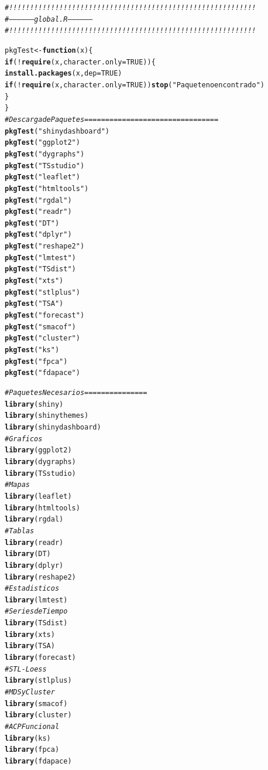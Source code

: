 \documentclass[12pt,oneside]{book}\usepackage[]{graphicx}\usepackage[]{color}
\makeatletter
\newcommand{\hlnum}[1]{\textcolor[rgb]{0.686,0.059,0.569}{#1}}%
\newcommand{\hlstr}[1]{\textcolor[rgb]{0.192,0.494,0.8}{#1}}%
\newcommand{\hlcom}[1]{\textcolor[rgb]{0.678,0.584,0.686}{\textit{#1}}}%
\newcommand{\hlopt}[1]{\textcolor[rgb]{0,0,0}{#1}}%
\newcommand{\hlstd}[1]{\textcolor[rgb]{0.345,0.345,0.345}{#1}}%
\newcommand{\hlkwa}[1]{\textcolor[rgb]{0.161,0.373,0.58}{\textbf{#1}}}%
\newcommand{\hlkwb}[1]{\textcolor[rgb]{0.69,0.353,0.396}{#1}}%
\newcommand{\hlkwc}[1]{\textcolor[rgb]{0.333,0.667,0.333}{#1}}%
\newcommand{\hlkwd}[1]{\textcolor[rgb]{0.737,0.353,0.396}{\textbf{#1}}}%
\newenvironment{kframe}{%
 \def\at@end@of@kframe{}%
 \ifinner\ifhmode%
  \def\at@end@of@kframe{\end{minipage}}%
  \begin{minipage}{\columnwidth}%
 \fi\fi%
 \def\FrameCommand##1{\hskip\@totalleftmargin \hskip-\fboxsep
 \colorbox{shadecolor}{##1}\hskip-\fboxsep
     \hskip-\linewidth \hskip-\@totalleftmargin \hskip\columnwidth}%
 \MakeFramed {\advance\hsize-\width
   \@totalleftmargin\z@ \linewidth\hsize
   \@setminipage}}%
 {\par\unskip\endMakeFramed%
 \at@end@of@kframe}
\newenvironment{knitrout}{}{} %
\theoremstyle{definition} %
\makeatother
\begin{document}
\begin{knitrout}\footnotesize
{}\color{fgcolor}\begin{kframe}
\begin{alltt}
\hlcom{#!!!!!!!!!!!!!!!!!!!!!!!!!!!!!!!!!!!!!!!!!!!!!!!!!!!!!!!!!!!}
\hlcom{#------------------        global.R       ------------------}
\hlcom{#!!!!!!!!!!!!!!!!!!!!!!!!!!!!!!!!!!!!!!!!!!!!!!!!!!!!!!!!!!!}

\hlstd{pkgTest} \hlkwb{<-} \hlkwa{function}\hlstd{(}\hlkwc{x}\hlstd{)\{}
  \hlkwa{if} \hlstd{(}\hlopt{!}\hlkwd{require}\hlstd{(x,}\hlkwc{character.only} \hlstd{=} \hlnum{TRUE}\hlstd{))\{}
    \hlkwd{install.packages}\hlstd{(x,}\hlkwc{dep}\hlstd{=}\hlnum{TRUE}\hlstd{)}
    \hlkwa{if}\hlstd{(}\hlopt{!}\hlkwd{require}\hlstd{(x,}\hlkwc{character.only} \hlstd{=} \hlnum{TRUE}\hlstd{))} \hlkwd{stop}\hlstd{(}\hlstr{"Paquete no encontrado"}\hlstd{)}
  \hlstd{\}}
\hlstd{\}}
\hlcom{#Descarga de Paquetes ================================}
\hlkwd{pkgTest}\hlstd{(}\hlstr{"shinydashboard"}\hlstd{)}
\hlkwd{pkgTest}\hlstd{(}\hlstr{"ggplot2"}\hlstd{)}
\hlkwd{pkgTest}\hlstd{(}\hlstr{"dygraphs"}\hlstd{)}
\hlkwd{pkgTest}\hlstd{(}\hlstr{"TSstudio"}\hlstd{)}
\hlkwd{pkgTest}\hlstd{(}\hlstr{"leaflet"}\hlstd{)}
\hlkwd{pkgTest}\hlstd{(}\hlstr{"htmltools"}\hlstd{)}
\hlkwd{pkgTest}\hlstd{(}\hlstr{"rgdal"}\hlstd{)}
\hlkwd{pkgTest}\hlstd{(}\hlstr{"readr"}\hlstd{)}
\hlkwd{pkgTest}\hlstd{(}\hlstr{"DT"}\hlstd{)}
\hlkwd{pkgTest}\hlstd{(}\hlstr{"dplyr"}\hlstd{)}
\hlkwd{pkgTest}\hlstd{(}\hlstr{"reshape2"}\hlstd{)}
\hlkwd{pkgTest}\hlstd{(}\hlstr{"lmtest"}\hlstd{)}
\hlkwd{pkgTest}\hlstd{(}\hlstr{"TSdist"}\hlstd{)}
\hlkwd{pkgTest}\hlstd{(}\hlstr{"xts"}\hlstd{)}
\hlkwd{pkgTest}\hlstd{(}\hlstr{"stlplus"}\hlstd{)}
\hlkwd{pkgTest}\hlstd{(}\hlstr{"TSA"}\hlstd{)}
\hlkwd{pkgTest}\hlstd{(}\hlstr{"forecast"}\hlstd{)}
\hlkwd{pkgTest}\hlstd{(}\hlstr{"smacof"}\hlstd{)}
\hlkwd{pkgTest}\hlstd{(}\hlstr{"cluster"}\hlstd{)}
\hlkwd{pkgTest}\hlstd{(}\hlstr{"ks"}\hlstd{)}
\hlkwd{pkgTest}\hlstd{(}\hlstr{"fpca"}\hlstd{)}
\hlkwd{pkgTest}\hlstd{(}\hlstr{"fdapace"}\hlstd{)}

\hlcom{# Paquetes Necesarios ===============}
\hlkwd{library}\hlstd{(shiny)}
\hlkwd{library}\hlstd{(shinythemes)}
\hlkwd{library}\hlstd{(shinydashboard)}
\hlcom{#Graficos}
\hlkwd{library}\hlstd{(ggplot2)}
\hlkwd{library}\hlstd{(dygraphs)}
\hlkwd{library}\hlstd{(TSstudio)}
\hlcom{#Mapas}
\hlkwd{library}\hlstd{(leaflet)}
\hlkwd{library}\hlstd{(htmltools)}
\hlkwd{library}\hlstd{(rgdal)}
\hlcom{#Tablas}
\hlkwd{library}\hlstd{(readr)}
\hlkwd{library}\hlstd{(DT)}
\hlkwd{library}\hlstd{(dplyr)}
\hlkwd{library}\hlstd{(reshape2)}
\hlcom{#Estadisticos}
\hlkwd{library}\hlstd{(lmtest)}
\hlcom{#Series de Tiempo}
\hlkwd{library}\hlstd{(TSdist)}
\hlkwd{library}\hlstd{(xts)}
\hlkwd{library}\hlstd{(TSA)}
\hlkwd{library}\hlstd{(forecast)}
\hlcom{# STL - Loess}
\hlkwd{library}\hlstd{(stlplus)}
\hlcom{#MDS y Cluster}
\hlkwd{library}\hlstd{(smacof)}
\hlkwd{library}\hlstd{(cluster)}
\hlcom{#ACP Funcional}
\hlkwd{library}\hlstd{(ks)}
\hlkwd{library}\hlstd{(fpca)}
\hlkwd{library}\hlstd{(fdapace)}


\end{alltt}
\end{kframe}
\end{knitrout}
\end{document}
